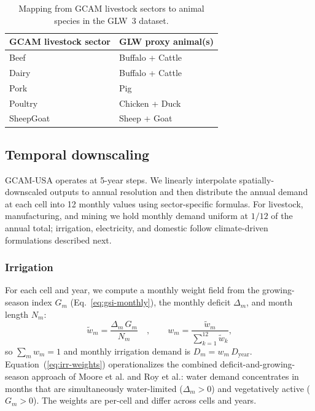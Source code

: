 \documentclass[fleqn,10pt]{wlscirep}
\begin{document}
\begin{table}[ht]
\centering
\begin{tabular}{ll}
\toprule
\textbf{GCAM livestock sector} & \textbf{GLW proxy animal(s)} \\
\midrule
Beef      & Buffalo + Cattle \\
Dairy     & Buffalo + Cattle \\
Pork      & Pig \\
Poultry   & Chicken + Duck \\
SheepGoat & Sheep + Goat \\
\bottomrule
\end{tabular}
\caption{Mapping from GCAM livestock sectors to animal species in the GLW~3 dataset.}
\label{tab:livestock}
\end{table}

\subsection*{Temporal downscaling}

GCAM-USA operates at 5-year steps. We linearly interpolate spatially-downscaled outputs to annual resolution and then distribute the annual demand at each cell into 12 monthly values using sector-specific formulas. For livestock, manufacturing, and mining we hold monthly demand uniform at $1/12$ of the annual total; irrigation, electricity, and domestic follow climate-driven formulations described next.

\subsubsection*{Irrigation}

For each cell and year, we compute a monthly weight field from the growing-season index $G_m$ (Eq.~\ref{eq:gsi-monthly}), the monthly deficit $\Delta_m$, and month length $N_m$:
\begin{equation}
\tilde{w}_m = \frac{\Delta_m \, G_m}{N_m}\quad, \qquad w_m = \frac{\tilde{w}_m}{\sum_{k=1}^{12}\tilde{w}_k},
\label{eq:irr-weights}
\end{equation}
so $\sum_m w_m = 1$ and monthly irrigation demand is $D_m = w_m \, D_{\mathrm{year}}$. Equation~(\ref{eq:irr-weights}) operationalizes the combined deficit-and-growing-season approach of Moore et al.\cite{Moore_2015} and Roy et al.\cite{Roy_2005}: water demand concentrates in months that are simultaneously water-limited ($\Delta_m > 0$) and vegetatively active ($G_m > 0$). The weights are per-cell and differ across cells and years.
\end{document}
